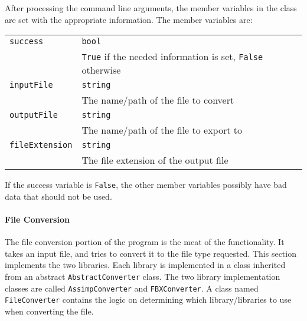     After processing the command line arguments, the member variables in the class are set with the appropriate information.  The member variables are:

    \begin{tabular}{l l}
        \centering
        \texttt{success} & \texttt{bool} \\
        & \texttt{True} if the needed information is set, \texttt{False} otherwise \\

        \texttt{inputFile} & \texttt{string} \\
        & The name/path of the file to convert \\

        \texttt{outputFile} & \texttt{string} \\
        & The name/path of the file to export to \\

        \texttt{fileExtension} & \texttt{string} \\
        & The file extension of the output file
    \end{tabular}

    If the success variable is \texttt{False}, the other member variables possibly have bad data that should not be used.

    \paragraph{File Conversion}
    \hfill \break
    The file conversion portion of the program is the meat of the functionality.  It takes an input file, and tries to convert it to the file type requested.
    This section implements the two libraries.  Each library is implemented in a class inherited from an abstract \texttt{AbstractConverter} class.  The two 
    library implementation classes are called \texttt{AssimpConverter} and \texttt{FBXConverter}.  A class named \texttt{FileConverter} contains the logic on determining which 
    library/libraries to use when converting the file.

